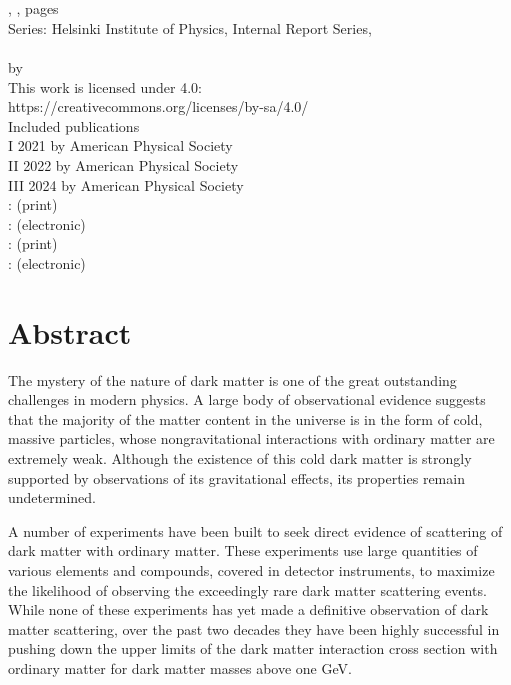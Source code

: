 \begin{copyrightpage}
    \thesisauthor\\
    \thesistitle\\
    \institution, \thesisyear, \ztotpages{} pages\\
    Series: Helsinki Institute of Physics, Internal Report Series, \hipseriesnumber\\[\baselineskip]
    \ccbysa\\
    \textcopyright{} \thesisyear{} by \thesisauthor\\
    This work is licensed under  4.0:\\
    https://creativecommons.org/licenses/by-sa/4.0/\\[\baselineskip]
    Included publications\\
    I \textcopyright{} 2021 by American Physical Society\\
    II \textcopyright{} 2022 by American Physical Society\\
    III \textcopyright{} 2024 by American Physical Society\\[\baselineskip]
    : \isbnp{} (print)\\
    : \isbne{} (electronic)\\
    : \issnp{} (print)\\
    : \issne{} (electronic)\\
\end{copyrightpage}

\tableofcontents

\chapter{Abstract}

The mystery of the nature of dark matter is one of the great outstanding challenges in modern physics. A large body of observational evidence suggests that the majority of the matter content in the universe is in the form of cold, massive particles, whose nongravitational interactions with ordinary matter are extremely weak. Although the existence of this cold dark matter is strongly supported by observations of its gravitational effects, its properties remain undetermined.

A number of experiments have been built to seek direct evidence of scattering of dark matter with ordinary matter. These experiments use large quantities of various elements and compounds, covered in detector instruments, to maximize the likelihood of observing the exceedingly rare dark matter scattering events. While none of these experiments has yet made a definitive observation of dark matter scattering, over the past two decades they have been highly successful in pushing down the upper limits of the dark matter interaction cross section with ordinary matter for dark matter masses above one GeV.

